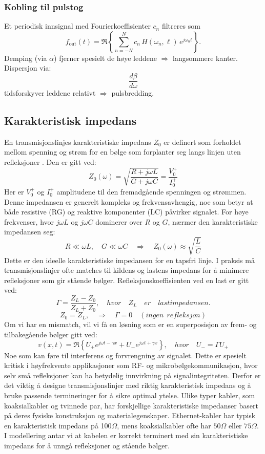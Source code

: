 \subsubsection{Kobling til pulstog}
Et periodisk innsignal med Fourierkoeffisienter \(c_n\) filtreres som
\[
f_{\text{out}}(t)=\Re\!\left\{\sum_{n=-N}^{N} c_n\,H(\omega_n,\ell)\,e^{j\omega_n t}\right\}.
\]
Demping (via \(\alpha\)) fjerner spesielt de høye leddene \(\Rightarrow\) langsommere kanter.\\
Dispersjon via: 
\[\frac{d\beta}{d\omega}\] 
tidsforskyver leddene relativt \(\Rightarrow\) pulsbredding.
\subsection{Karakteristisk impedans}
En transmisjonslinjes karakteristiske impedans \(Z_0\) er definert som forholdet mellom spenning og strøm for en bølge som forplanter seg langs linjen uten refleksjoner \cite{HaytBuck2018}. Den er gitt ved:
\[
Z_0(\omega) = \sqrt{\frac{R + j\omega L}{G + j\omega C}} = \frac{V_0^+}{I_0^+} 
\]
Her er \(V_0^+\) og \(I_0^+\) amplitudene til den fremadgående spenningen og strømmen.
Denne impedansen er generelt kompleks og frekvensavhengig, noe som betyr at både resistive (RG) og reaktive komponenter (LC) påvirker signalet. 
\clearpage
\noindent For høye frekvenser, hvor \(j\omega L\) og \(j\omega C\) dominerer over \(R\) og \(G\), nærmer den karakteristiske impedansen seg:
\[
    R \ll \omega L, \quad G \ll \omega C \quad \Rightarrow \quad Z_0(\omega) \approx \sqrt{\frac{L}{C}}
\]
Dette er den ideelle karakteristiske impedansen for en tapsfri linje. I praksis må transmisjonslinjer ofte matches til kildens og lastens impedans for å minimere refleksjoner som gir stående bølger. Refleksjonskoeffisienten ved en last er gitt ved:
\[
    \Gamma = \frac{Z_L - Z_0}{Z_L + Z_0}, \quad hvor \quad Z_L \quad er \quad lastimpedansen.
\]
\[
    Z_0 = Z_L, \quad \Rightarrow \quad \Gamma = 0 \quad (ingen\ \ refleksjon)
\]
Om vi har en mismatch, vil vi få en løsning som er en superposisjon av frem- og tilbakegående bølger gitt ved:
\[
    v(x,t) = \Re\!\left\{ U_+ e^{j\omega t - \gamma x} + U_- e^{j\omega t + \gamma x} \right\}, \quad hvor \quad U_- = \Gamma U_+
\]
\noindent Noe som kan føre til interferens og forvrengning av signalet. Dette er spesielt kritisk i høyfrekvente applikasjoner som RF- og mikrobølgekommunikasjon, hvor selv små refleksjoner kan ha betydelig innvirkning på signalintegriteten. Derfor er det viktig å designe transmisjonslinjer med riktig karakteristisk impedans og å bruke passende termineringer for å sikre optimal ytelse.
Ulike typer kabler, som koaksialkabler og tvinnede par, har forskjellige karakteristiske impedanser basert på deres fysiske konstruksjon og materialegenskaper. Ethernet-kabler har typisk en karakteristisk impedans på 100\(\Omega\), mens koaksialkabler ofte har $50\Omega$ eller $75\Omega$. I modellering antar vi at kabelen er korrekt terminert med sin karakteristiske impedans for å unngå refleksjoner og stående bølger.
